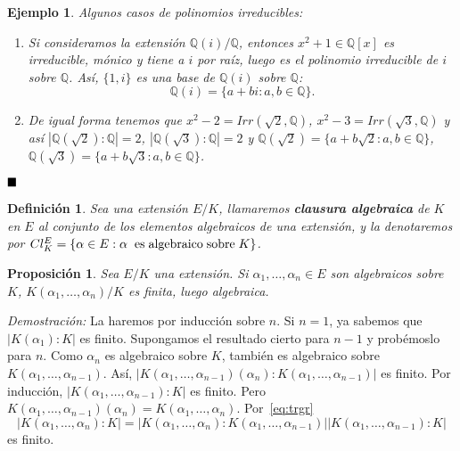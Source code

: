 \documentclass[12pt]{article}
\newtheorem{proposition}[theorem]{Proposición}
\newtheorem{definition}[theorem]{Definición}
\newtheorem{example}{Ejemplo}[theorem]
\begin{document}
\begin{example}Algunos casos de polinomios irreducibles:
\begin{enumerate}
\item Si consideramos la extensión $\mathbb{Q}(i)/\mathbb{Q}$, entonces $x^2+1 \in \mathbb{Q}[x]$ es irreducible, mónico y tiene a $i$ por raíz, luego es el polinomio irreducible de $i$ sobre $\mathbb{Q}$. Así, $\lbrace 1,i \rbrace$ es una base de $\mathbb{Q}(i)$ sobre $\mathbb{Q}$: $$\mathbb{Q}(i)=\lbrace a+bi: a,b \in \mathbb{Q} \rbrace.$$
\item De igual forma tenemos que $x^2-2 =Irr(\sqrt{2}, \mathbb{Q})$, $x^2-3 = Irr(\sqrt{3}, \mathbb{Q})$ y así $|\mathbb{Q}(\sqrt{2}):\mathbb{Q}| = 2$, $|\mathbb{Q}(\sqrt{3}):\mathbb{Q}| = 2$ y $\mathbb{Q}(\sqrt{2}) = \lbrace a+b\sqrt{2}:a,b \in \mathbb{Q} \rbrace$, $\mathbb{Q}(\sqrt{3}) = \lbrace a+b\sqrt{3}:a,b \in \mathbb{Q} \rbrace$.
\end{enumerate}
\end{example}
$\hfill \blacksquare$


\begin{definition} Sea una extensión $E/K$, llamaremos \textbf{clausura algebraica} de $K$ en $E$ al conjunto de los elementos algebraicos de una extensión, y la denotaremos por $Cl_{K}^{E} = \lbrace \alpha \in E: \alpha \hspace{0.2cm} \text{es} \hspace{0.1cm} \text{algebraico} \hspace{0.1cm} \text{sobre} \hspace{0.1cm} K \rbrace$.
\end{definition} 

\begin{proposition}\label{eq:finalg} Sea $E/K$ una extensión. Si $\alpha_{1}, \ldots, \alpha_{n} \in E$ son algebraicos sobre $K$, $K(\alpha_{1}, \ldots, \alpha_{n})/K$ es finita, luego algebraica.
\end{proposition}
\emph{Demostración: } La haremos por inducción sobre $n$. Si $n = 1$, ya sabemos que $|K(\alpha_{1}):K|$ es finito. Supongamos el resultado cierto para $n-1$ y probémoslo para $n$. Como $\alpha_{n}$ es algebraico sobre $K$, también es algebraico sobre $K(\alpha_{1}, \ldots, \alpha_{n-1})$. Así, $|K(\alpha_{1}, \ldots, \alpha_{n-1}) (\alpha_{n}) : K(\alpha_{1}, \ldots, \alpha_{n-1})|$ es finito. Por inducción, $|K(\alpha_{1}, \ldots, \alpha_{n-1}) : K|$ es finito. Pero $K(\alpha_{1}, \ldots, \alpha_{n-1}) (\alpha_{n}) = K(\alpha_{1}, \ldots, \alpha_{n})$. Por~\ref{eq:trgr} $$|K(\alpha_{1}, \ldots, \alpha_{n}) : K| = |K(\alpha_{1}, \ldots, \alpha_{n}) : K(\alpha_{1}, \ldots, \alpha_{n-1})| |K(\alpha_{1}, \ldots, \alpha_{n-1}) : K|$$ es finito.
\end{document}
